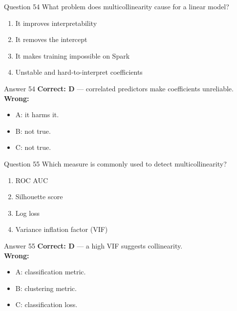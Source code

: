\documentclass[aspectratio=169,11pt]{beamer}
\begin{document}
\begin{frame}{Question 54}
What problem does multicollinearity cause for a linear model?
\begin{enumerate}[label=\Alph*.]
\item It improves interpretability
\item It removes the intercept
\item It makes training impossible on Spark
\item Unstable and hard-to-interpret coefficients
\end{enumerate}
\end{frame}
\begin{frame}{Answer 54}
\textbf{Correct: D} --- correlated predictors make coefficients unreliable.\\
\vspace{0.5em}
\textbf{Wrong:}
\begin{itemize}
\item A: it harms it.
\item B: not true.
\item C: not true.
\end{itemize}
\end{frame}

\begin{frame}{Question 55}
Which measure is commonly used to detect multicollinearity?
\begin{enumerate}[label=\Alph*.]
\item ROC AUC
\item Silhouette score
\item Log loss
\item Variance inflation factor (VIF)
\end{enumerate}
\end{frame}
\begin{frame}{Answer 55}
\textbf{Correct: D} --- a high VIF suggests collinearity.\\
\vspace{0.5em}
\textbf{Wrong:}
\begin{itemize}
\item A: classification metric.
\item B: clustering metric.
\item C: classification loss.
\end{itemize}
\end{frame}
\end{document}
